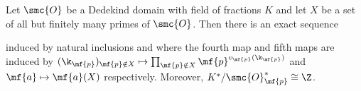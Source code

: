      \begin{proposition}\label{prop:ideal_class_group_localization_exact_sequence}
      Let \(\smc{O}\) be a Dedekind domain with field of fractions \(K\) and let \(X\) be a set of all but finitely many primes of \(\smc{O}\). Then there is an exact sequence
      \begin{center}
      \end{center}
      induced by natural inclusions and where the fourth map and fifth maps are induced by \((\k_{\mf{p}})_{\mf{p} \notin X} \mapsto \prod_{\mf{p} \notin X}\mf{p}^{v_{\mf{p}}(\k_{\mf{p}})}\) and \(\mf{a} \mapsto \mf{a}(X)\) respectively. Moreover, \(K^{\ast}/\smc{O}_{\mf{p}}^{\ast} \cong \Z\).
    \end{proposition}
